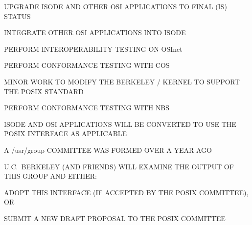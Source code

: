 \begin{bwslide}

\begin{nrtc}
\item	UPGRADE ISODE AND OTHER OSI APPLICATIONS TO FINAL (IS) STATUS

\item	INTEGRATE OTHER OSI APPLICATIONS INTO ISODE

\item	PERFORM INTEROPERABILITY TESTING ON OSInet

\item	PERFORM CONFORMANCE TESTING WITH COS
\end{nrtc}
\end{bwslide}


\begin{bwslide}

\begin{nrtc}
\item	MINOR WORK TO MODIFY THE BERKELEY \unix/ KERNEL TO SUPPORT THE POSIX
	STANDARD

\item	PERFORM CONFORMANCE TESTING WITH NBS

\item	ISODE AND OSI APPLICATIONS WILL BE CONVERTED TO USE THE POSIX
	INTERFACE AS APPLICABLE
\end{nrtc}
\end{bwslide}


\begin{bwslide}

\begin{nrtc}
\item	A /usr/group COMMITTEE WAS FORMED OVER A YEAR AGO

\item	U.C.~BERKELEY (AND FRIENDS) WILL EXAMINE THE OUTPUT OF THIS
	GROUP AND EITHER:
    \begin{nrtc}
    \item	ADOPT THIS INTERFACE (IF ACCEPTED BY THE POSIX COMMITTEE), OR

    \item	SUBMIT A NEW DRAFT PROPOSAL TO THE POSIX COMMITTEE
    \end{nrtc}
\end{nrtc}
\end{bwslide}


